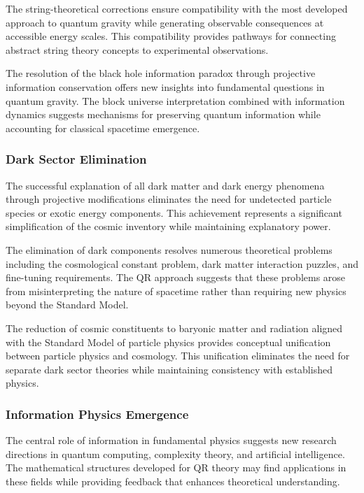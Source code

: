 The string-theoretical corrections ensure compatibility with the most developed approach to quantum gravity while generating observable consequences at accessible energy scales. This compatibility provides pathways for connecting abstract string theory concepts to experimental observations.

The resolution of the black hole information paradox through projective information conservation offers new insights into fundamental questions in quantum gravity. The block universe interpretation combined with information dynamics suggests mechanisms for preserving quantum information while accounting for classical spacetime emergence.

\subsubsection{Dark Sector Elimination}
\label{subsubsec:dark-sector-elimination}

The successful explanation of all dark matter and dark energy phenomena through projective modifications eliminates the need for undetected particle species or exotic energy components. This achievement represents a significant simplification of the cosmic inventory while maintaining explanatory power.

The elimination of dark components resolves numerous theoretical problems including the cosmological constant problem, dark matter interaction puzzles, and fine-tuning requirements. The QR approach suggests that these problems arose from misinterpreting the nature of spacetime rather than requiring new physics beyond the Standard Model.

The reduction of cosmic constituents to baryonic matter and radiation aligned with the Standard Model of particle physics provides conceptual unification between particle physics and cosmology. This unification eliminates the need for separate dark sector theories while maintaining consistency with established physics.

\subsubsection{Information Physics Emergence}
\label{subsubsec:information-physics}

The central role of information in fundamental physics suggests new research directions in quantum computing, complexity theory, and artificial intelligence. The mathematical structures developed for QR theory may find applications in these fields while providing feedback that enhances theoretical understanding.

